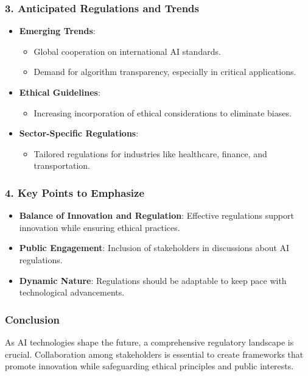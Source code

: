 \documentclass[aspectratio=169]{beamer}
\begin{document}
\begin{frame}[fragile]
    \frametitle{3. Anticipated Regulations and Trends}
    \begin{itemize}
        \item \textbf{Emerging Trends}:
        \begin{itemize}
            \item Global cooperation on international AI standards.
            \item Demand for algorithm transparency, especially in critical applications.
        \end{itemize}
        
        \item \textbf{Ethical Guidelines}: 
        \begin{itemize}
            \item Increasing incorporation of ethical considerations to eliminate biases.
        \end{itemize}

        \item \textbf{Sector-Specific Regulations}: 
        \begin{itemize}
            \item Tailored regulations for industries like healthcare, finance, and transportation.
        \end{itemize}
    \end{itemize}
\end{frame}

\begin{frame}[fragile]
    \frametitle{4. Key Points to Emphasize}
    \begin{itemize}
        \item \textbf{Balance of Innovation and Regulation}: Effective regulations support innovation while ensuring ethical practices.
        \item \textbf{Public Engagement}: Inclusion of stakeholders in discussions about AI regulations.
        \item \textbf{Dynamic Nature}: Regulations should be adaptable to keep pace with technological advancements.
    \end{itemize}
\end{frame}

\begin{frame}[fragile]
    \frametitle{Conclusion}
    As AI technologies shape the future, a comprehensive regulatory landscape is crucial. Collaboration among stakeholders is essential to create frameworks that promote innovation while safeguarding ethical principles and public interests.
\end{frame}
\end{document}
